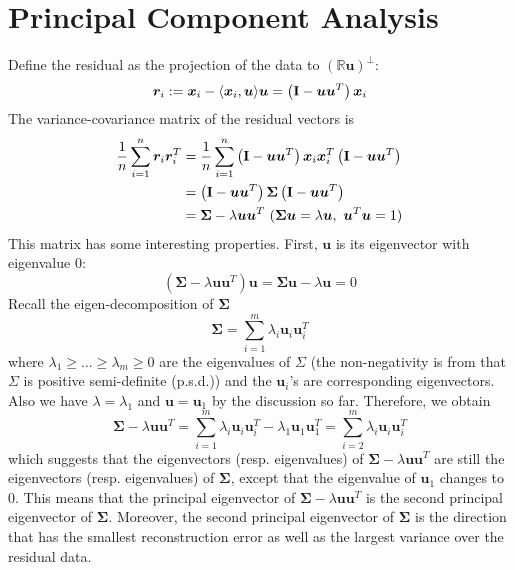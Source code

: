\documentclass[../book-template.tex]{subfiles}
\begin{document}
\section{Principal Component Analysis}
Define the residual as the projection of the data to $(\mathbb{R}\bm{u})^{\bot}$:
\begin{equation*}
    \bm{r}_i:=\bm{x}_i - \langle\bm{x}_i,\bm{u}  \rangle\bm{u} = \left({\bf I} - \bm{uu}^T \right)\bm{x}_i
\end{equation*}
The variance-covariance matrix of the residual vectors is
\begin{align*}
    \frac{1}{n}\sum_{i=1}^n \bm{r}_i\bm{r}_i^T &=  \frac{1}{n}\sum_{i=1}^n \left({\bf I} - \bm{uu}^T \right)\bm{x}_i\bm{x}_i^T\left({\bf I} - \bm{uu}^T \right)\\
    &= \left({\bf I} - \bm{uu}^T \right)\bm{\Sigma}\left({\bf I} - \bm{uu}^T \right)\\
    &=\bm{\Sigma} - \lambda\bm{uu}^T\ (\bm{\Sigma u}=\lambda \bm{u},\ \bm{u}^T\bm{u}=1)
\end{align*}
This matrix has some interesting properties. First, $\bm{u}$ is its eigenvector with eigenvalue $0$:
\begin{equation*}
    \left(\bm{\Sigma} - \lambda\bm{uu}^T\right)\bm{u} = \bm{\Sigma u}-\lambda \bm{u}=0
\end{equation*}
Recall the eigen-decomposition of $\bm{\Sigma}$
\begin{equation}\label{eq_2_edom}
    \bm{\Sigma} = \sum_{i=1}^m \lambda_i\bm{u}_i\bm{u}_i^T
\end{equation}
where $\lambda_1\geq\dots\geq\lambda_m\geq 0$ are the eigenvalues of $\Sigma$ (the non-negativity is from that $\Sigma$ is positive semi-definite (p.s.d.)) and the $\bm{u}_i$'s are corresponding eigenvectors. Also we have $\lambda = \lambda_1$ and $\bm{u}=\bm{u}_1$ by the discussion so far. Therefore, we obtain
\begin{equation*}
    \bm{\Sigma} - \lambda\bm{uu}^T = \sum_{i=1}^m \lambda_i\bm{u}_i\bm{u}_i^T - \lambda_1\bm{u}_1\bm{u}_1^T = \sum_{i=2}^m \lambda_i\bm{u}_i\bm{u}_i^T
\end{equation*}
which suggests that the eigenvectors (resp. eigenvalues) of $\bm{\Sigma} - \lambda\bm{uu}^T$ are still the eigenvectors (resp. eigenvalues) of $\bm{\Sigma}$, except that the eigenvalue of $\bm{u}_1$ changes to $0$. This means that the principal eigenvector of $\bm{\Sigma} - \lambda\bm{uu}^T$ is the second principal eigenvector of $\bm{\Sigma}$. Moreover, the second principal eigenvector of $\bm{\Sigma}$ is the direction that has the smallest reconstruction error as well as the largest variance over the residual data.
\end{document}
